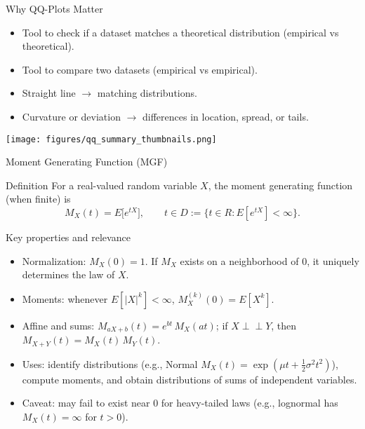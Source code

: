 \documentclass{beamer}
\def\E{E}%
\def\mathbb#1{#1}%
\newcommand{\R}{\mathbb{R}}
\newcommand{\E}{\mathbb{E}}
\newcommand{\1}{\mathbf{1}}
\newcommand{\indep}{\perp\!\!\!\perp}
\begin{document}
\begin{frame}{Why QQ-Plots Matter}
  \begin{itemize}
    \item Tool to check if a dataset matches a theoretical distribution (empirical vs theoretical).
    \item Tool to compare two datasets (empirical vs empirical).
    \item Straight line $\rightarrow$ matching distributions.
    \item Curvature or deviation $\rightarrow$ differences in location, spread, or tails.
  \end{itemize}
  \vspace{0.5em}
  \begin{center}
    \texttt{[image: figures/qq\_summary\_thumbnails.png]}
  \end{center}
\end{frame}

\begin{frame}{Moment Generating Function (MGF)}{}
  {\small
    \begin{block}{Definition}
      For a real-valued random variable $X$, the moment generating function (when finite) is
      \[
        M_X(t) = \E\big[e^{tX}\big], \qquad t\in D := \{t\in\R : \E[e^{tX}] < \infty\}.
      \]
    \end{block}
    \vspace{-0.35em}
    \begin{block}{Key properties and relevance}
    \begin{itemize}\setlength{\itemsep}{0.15em}
        \item Normalization: $M_X(0)=1$. If $M_X$ exists on a neighborhood of $0$, it uniquely determines the law of $X$.
        \item Moments: whenever $\E[|X|^k]<\infty$, $M_X^{(k)}(0)=\E[X^k]$.
        \item Affine and sums: $M_{aX+b}(t)=e^{bt}\,M_X(at)$; if $X\indep Y$, then $M_{X+Y}(t)=M_X(t)\,M_Y(t)$.
        \item Uses: identify distributions (e.g., Normal $M_X(t)=\exp(\mu t+\tfrac12\sigma^2 t^2)$), compute moments, and obtain distributions of sums of independent variables.
        \item Caveat: may fail to exist near $0$ for heavy-tailed laws (e.g., lognormal has $M_X(t)=\infty$ for $t>0$).
      \end{itemize}
    \end{block}
  }
\end{frame}
\end{document}
